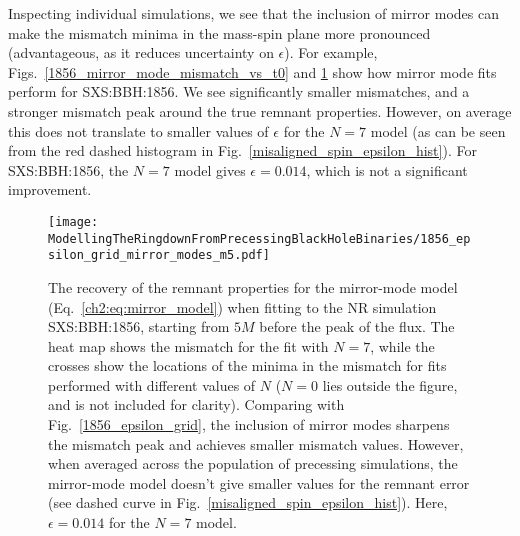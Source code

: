 Inspecting individual simulations, we see that the inclusion of mirror modes can make the mismatch minima in the mass-spin plane more pronounced (advantageous, as it reduces uncertainty on $\epsilon$). For example, Figs.~\ref{1856_mirror_mode_mismatch_vs_t0} and \ref{1856_mirror_mode_epsilon_grid} show how mirror mode fits perform for SXS:BBH:1856. 
We see significantly smaller mismatches, and a stronger mismatch peak around the true remnant properties. However, on average this does not translate to smaller values of $\epsilon$ for the $N=7$ model (as can be seen from the red dashed histogram in Fig.~\ref{misaligned_spin_epsilon_hist}). For SXS:BBH:1856, the $N=7$ model gives $\epsilon = 0.014$, which is not a significant improvement.

\begin{figure}[t]
    \centering
    \texttt{[image: ModellingTheRingdownFromPrecessingBlackHoleBinaries/1856\_epsilon\_grid\_mirror\_modes\_m5.pdf]}
    \caption[Recovery of the SXS:BBH:1856 remnant properties using the mirror-mode model starting from $5M$ before the peak of the GW energy flux]{ 
    The recovery of the remnant properties for the mirror-mode model (Eq.~\ref{ch2:eq:mirror_model}) when fitting to the NR simulation SXS:BBH:1856, starting from $5M$ before the peak of the flux. The heat map shows the mismatch for the fit with $N=7$, while the crosses show the locations of the minima in the mismatch for fits performed with different values of $N$ ($N=0$ lies outside the figure, and is not included for clarity). Comparing with Fig.~\ref{1856_epsilon_grid}, the inclusion of mirror modes sharpens the mismatch peak and achieves smaller mismatch values. However, when averaged across the population of precessing simulations, the mirror-mode model doesn't give smaller values for the remnant error (see dashed curve in Fig.~\ref{misaligned_spin_epsilon_hist}). Here, $\epsilon = 0.014$ for the $N=7$ model.
    }
	\label{1856_mirror_mode_epsilon_grid}
\end{figure}

